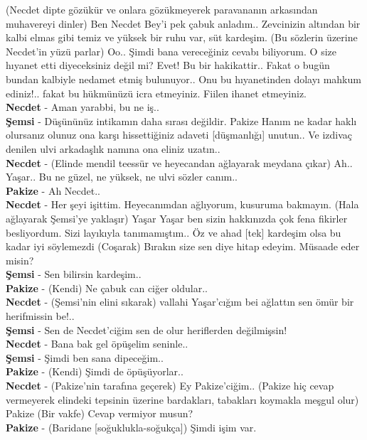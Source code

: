 \documentclass[]{book}
\begin{document}
(Necdet dipte gözükür ve onlara gözükmeyerek paravananın arkasından muhavereyi dinler) Ben Necdet Bey'i pek çabuk anladım.. Zevcinizin altından bir kalbi elmas gibi temiz ve yüksek bir ruhu var, süt kardeşim. (Bu sözlerin üzerine Necdet'in yüzü parlar) Oo.. Şimdi bana vereceğiniz cevabı biliyorum. O size hıyanet etti diyeceksiniz değil mi? Evet! Bu bir hakikattir.. Fakat o bugün bundan kalbiyle nedamet etmiş bulunuyor.. Onu bu hıyanetinden dolayı mahkum ediniz!.. fakat bu hükmünüzü icra etmeyiniz. Fiilen ihanet etmeyiniz.\\
\textbf{Necdet} - Aman yarabbi, bu ne iş..\\
\textbf{Şemsi} - Düşününüz intikamın daha sırası değildir. Pakize Hanım ne kadar haklı olursanız olunuz ona karşı hissettiğiniz adaveti {[}düşmanlığı{]} unutun.. Ve izdivaç denilen ulvi arkadaşlık namına ona eliniz uzatın..\\
\textbf{Necdet} - (Elinde mendil teessür ve heyecandan ağlayarak meydana çıkar) Ah.. Yaşar.. Bu ne güzel, ne yüksek, ne ulvi sözler canım..\\
\textbf{Pakize} - Ah Necdet..\\
\textbf{Necdet} - Her şeyi işittim. Heyecanımdan ağlıyorum, kusuruma bakmayın. (Hala ağlayarak Şemsi'ye yaklaşır) Yaşar Yaşar ben sizin hakkınızda çok fena fikirler besliyordum. Sizi layıkıyla tanımamıştım.. Öz ve ahad {[}tek{]} kardeşim olsa bu kadar iyi söylemezdi (Coşarak) Bırakın size sen diye hitap edeyim. Müsaade eder misin?\\
\textbf{Şemsi} - Sen bilirsin kardeşim..\\
\textbf{Pakize} - (Kendi) Ne çabuk can ciğer oldular..\\
\textbf{Necdet} - (Şemsi'nin elini sıkarak) vallahi Yaşar'cığım bei ağlattın sen ömür bir herifmissin be!..\\
\textbf{Şemsi} - Sen de Necdet'ciğim sen de olur heriflerden değilmişsin!\\
\textbf{Necdet} - Bana bak gel öpüşelim seninle..\\
\textbf{Şemsi} - Şimdi ben sana dipeceğim..\\
\textbf{Pakize} - (Kendi) Şimdi de öpüşüyorlar..\\
\textbf{Necdet} - (Pakize'nin tarafına geçerek) Ey Pakize'ciğim.. (Pakize hiç cevap vermeyerek elindeki tepsinin üzerine bardakları, tabakları koymakla meşgul olur) Pakize (Bir vakfe) Cevap vermiyor musun?\\
\textbf{Pakize} - (Baridane {[}soğuklukla-soğukça{]}) Şimdi işim var.\\
\end{document}
